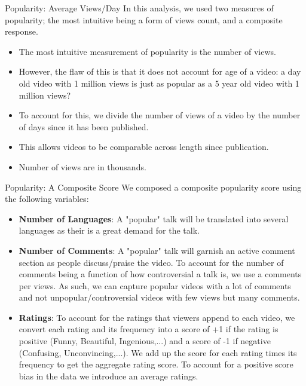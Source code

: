 \begin{frame}{Popularity: Average Views/Day}
	In this analysis, we used two measures of popularity; the most intuitive being a form of views count, and a composite response.
\begin{itemize}
\item The most intuitive measurement of popularity is the number of views. 
\item However, the flaw of this is that it does not account for age of a video: a day old video with 1 million views is just as popular as a 5 year old video with 1 million views?
\item  To account for this, we divide the number of views of a video by the number of days since it has been published. 
\item This allows videos to be comparable across length since publication.
\item  Number of views are in thousands.
\end{itemize}
\end{frame}

\begin{frame}{Popularity: A Composite Score}
We composed a composite popularity score using the following variables:
\begin{itemize}
	\item \textbf{Number of Languages}: A "popular" talk will be translated into several languages as their is a great demand for the talk.
	\item \textbf{Number of Comments}: A "popular" talk will garnish an active comment section as people discuss/praise the video. To account for the number of comments being a function of how controversial a talk is, we use a comments per views. As such, we can capture popular videos with a lot of comments and not unpopular/controversial videos with few views but many comments. 
	\item \textbf{Ratings}: To account for the ratings that viewers append to each video, we convert each rating and its frequency into a score of +1 if the rating is positive (Funny, Beautiful, Ingenious,...) and a score of -1 if negative (Confusing, Unconvincing,...). We add up the score for each rating times its frequency to get the aggregate rating score. To account for a positive score bias in the data we introduce an average ratings.
\end{itemize}
\end{frame}

